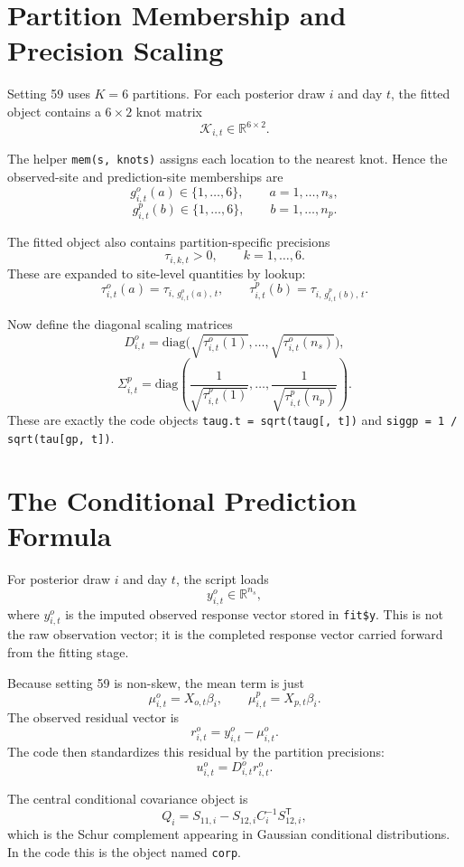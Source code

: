 \documentclass[11pt]{article}
\newcommand{\R}{\mathbb{R}}
\newcommand{\diag}{\mathrm{diag}}
\newcommand{\trans}{\mathsf{T}}
\begin{document}
\section{Partition Membership and Precision Scaling}

Setting 59 uses \(K=6\) partitions. For each posterior draw \(i\) and day \(t\),
the fitted object contains a \(6 \times 2\) knot matrix
\[
\mathcal{K}_{i,t} \in \R^{6 \times 2}.
\]

The helper \texttt{mem(s, knots)} assigns each location to the nearest knot.
Hence the observed-site and prediction-site memberships are
\[
g^o_{i,t}(a) \in \{1,\dots,6\}, \qquad a=1,\dots,n_s,
\]
\[
g^p_{i,t}(b) \in \{1,\dots,6\}, \qquad b=1,\dots,n_p.
\]

The fitted object also contains partition-specific precisions
\[
\tau_{i,k,t} > 0,
\qquad k=1,\dots,6.
\]
These are expanded to site-level quantities by lookup:
\[
\tau^o_{i,t}(a) = \tau_{i,\, g^o_{i,t}(a),\, t},
\qquad
\tau^p_{i,t}(b) = \tau_{i,\, g^p_{i,t}(b),\, t}.
\]

Now define the diagonal scaling matrices
\[
D^o_{i,t} = \diag\!\bigl(\sqrt{\tau^o_{i,t}(1)}, \dots,
\sqrt{\tau^o_{i,t}(n_s)}\bigr),
\]
\[
\Sigma^p_{i,t} = \diag\!\left(
\frac{1}{\sqrt{\tau^p_{i,t}(1)}}, \dots,
\frac{1}{\sqrt{\tau^p_{i,t}(n_p)}}
\right).
\]
These are exactly the code objects
\texttt{taug.t = sqrt(taug[, t])} and
\texttt{siggp = 1 / sqrt(tau[gp, t])}.

\section{The Conditional Prediction Formula}

For posterior draw \(i\) and day \(t\), the script loads
\[
y^o_{i,t} \in \R^{n_s},
\]
where \(y^o_{i,t}\) is the imputed observed response vector stored in
\texttt{fit\$y}. This is not the raw observation vector; it is the completed
response vector carried forward from the fitting stage.

Because setting 59 is non-skew, the mean term is just
\[
\mu^o_{i,t} = X_{o,t}\beta_i,
\qquad
\mu^p_{i,t} = X_{p,t}\beta_i.
\]
The observed residual vector is
\[
r^o_{i,t} = y^o_{i,t} - \mu^o_{i,t}.
\]
The code then standardizes this residual by the partition precisions:
\[
u^o_{i,t} = D^o_{i,t} r^o_{i,t}.
\]

The central conditional covariance object is
\[
Q_i = S_{11,i} - S_{12,i} C_i^{-1} S_{12,i}^\trans,
\]
which is the Schur complement appearing in Gaussian conditional
distributions. In the code this is the object named \texttt{corp}.
\end{document}
